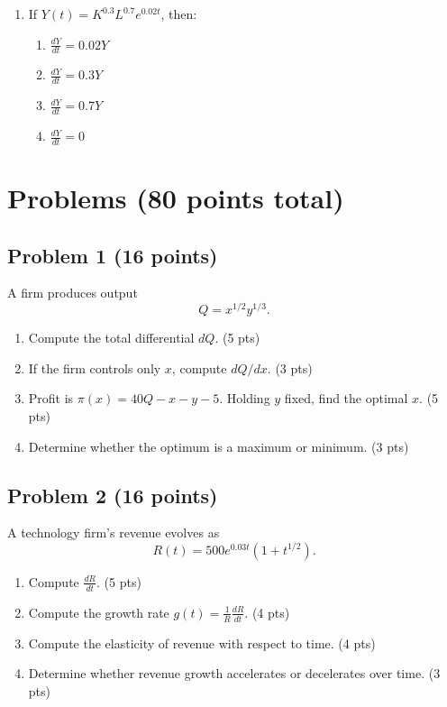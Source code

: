 \documentclass[12pt]{article}
\begin{document}
\begin{enumerate}
\begin{enumerate}
        \item \(y=4 e^{3t}\)
    \end{enumerate}
\vspace{0.75cm}
    \item If \(Y(t)=K^{0.3} L^{0.7} e^{0.02t}\), then:
    \begin{enumerate}
        \item \(\frac{dY}{dt} = 0.02Y\)
        \item \(\frac{dY}{dt} = 0.3Y\)
        \item \(\frac{dY}{dt} = 0.7Y\)
        \item \(\frac{dY}{dt} = 0\)
    \end{enumerate}

\end{enumerate}

\section*{Problems (80 points total)}

\subsection*{Problem 1 (16 points)}
A firm produces output  
\[
Q = x^{1/2} y^{1/3}.
\]

\begin{enumerate}
    \item Compute the total differential \(dQ\). \hfill (5 pts)
    \item If the firm controls only \(x\), compute \(dQ/dx\). \hfill (3 pts)
    \item Profit is \(\pi(x)=40Q - x - y - 5\). Holding \(y\) fixed, find the optimal \(x\). \hfill (5 pts)
    \item Determine whether the optimum is a maximum or minimum. \hfill (3 pts)
\end{enumerate}

\subsection*{Problem 2 (16 points)}
A technology firm's revenue evolves as  
\[
R(t)=500 e^{0.03 t}(1+t^{1/2}).
\]

\begin{enumerate}
    \item Compute \(\frac{dR}{dt}\). \hfill (5 pts)
    \item Compute the growth rate \(g(t)=\frac{1}{R}\frac{dR}{dt}\). \hfill (4 pts)
    \item Compute the elasticity of revenue with respect to time. \hfill (4 pts)
    \item Determine whether revenue growth accelerates or decelerates over time. \hfill (3 pts)
\end{enumerate}
\end{document}
